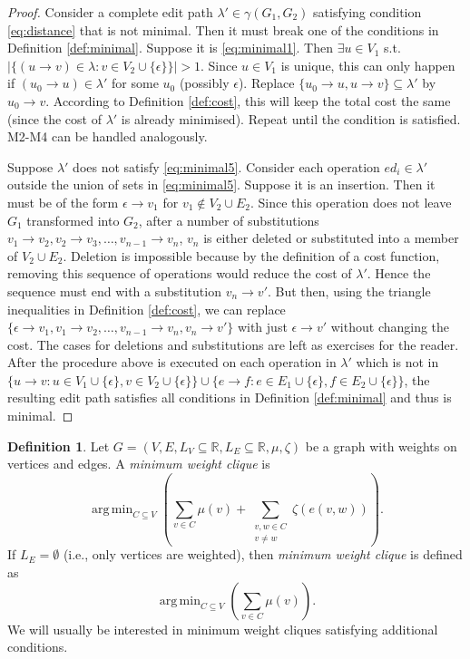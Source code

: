 \documentclass{article}
\DeclareMathOperator*{\argmin}{arg\,min}
\theoremstyle{definition}
\newtheorem{definition}{Definition}
\begin{document}
\begin{proof}
  Consider a complete edit path $\lambda' \in \gamma(G_1, G_2)$ satisfying condition \ref{eq:distance} that is not minimal. Then it must break one of the conditions in Definition \ref{def:minimal}. Suppose it is \ref{eq:minimal1}. Then $\exists u \in V_1$ s.t. $|\{ (u \to v) \in \lambda: v \in V_2 \cup \{ \epsilon \} \}| > 1$. Since $u \in V_1$ is unique, this can only happen if $(u_0 \to u) \in \lambda'$ for some $u_0$ (possibly $\epsilon$). Replace $\{ u_0 \to u, u \to v \} \subseteq \lambda'$ by $u_0 \to v$. According to Definition \ref{def:cost}, this will keep the total cost the same (since the cost of $\lambda'$ is already minimised). Repeat until the condition is satisfied. M2-M4 can be handled analogously.

  Suppose $\lambda'$ does not satisfy \ref{eq:minimal5}. Consider each operation $ed_i \in \lambda'$ outside the union of sets in \ref{eq:minimal5}. Suppose it is an insertion. Then it must be of the form $\epsilon \to v_1$ for $v_1 \not \in V_2 \cup E_2$. Since this operation does not leave $G_1$ transformed into $G_2$, after a number of substitutions $v_1 \to v_2, v_2 \to v_3, \dots, v_{n-1} \to v_n$, $v_n$ is either deleted or substituted into a member of $V_2 \cup E_2$. Deletion is impossible because by the definition of a cost function, removing this sequence of operations would reduce the cost of $\lambda'$. Hence the sequence must end with a substitution $v_n \to v'$. But then, using the triangle inequalities in Definition \ref{def:cost}, we can replace $\{ \epsilon \to v_1, v_1 \to v_2, \dots, v_{n-1} \to v_n, v_n \to v' \}$ with just $\epsilon \to v'$ without changing the cost. The cases for deletions and substitutions are left as exercises for the reader. After the procedure above is executed on each operation in $\lambda'$ which is not in $\{ u \to v: u \in V_1 \cup \{ \epsilon \}, v \in V_2 \cup \{ \epsilon \} \} \cup \{ e \to f: e \in E_1 \cup \{ \epsilon \}, f \in E_2 \cup \{ \epsilon \} \}$, the resulting edit path satisfies all conditions in Definition \ref{def:minimal} and thus is minimal.
\end{proof}
\begin{definition}
  Let $G = (V, E, L_V \subseteq \mathbb{R}, L_E \subseteq \mathbb{R}, \mu, \zeta)$ be a graph with weights on vertices and edges. A \emph{minimum weight clique} is
  \[ \argmin_{C \subseteq V} \left( \sum_{v \in C} \mu(v) + \sum_{\substack{v, w \in C\\v \ne w}} \zeta(e(v, w)) \right). \]
  If $L_E = \emptyset$ (i.e., only vertices are weighted), then \emph{minimum weight clique} is defined as
  \[ \argmin_{C \subseteq V} \left( \sum_{v \in C} \mu(v) \right). \]
  We will usually be interested in minimum weight cliques satisfying additional conditions.
\end{definition}
\end{document}
